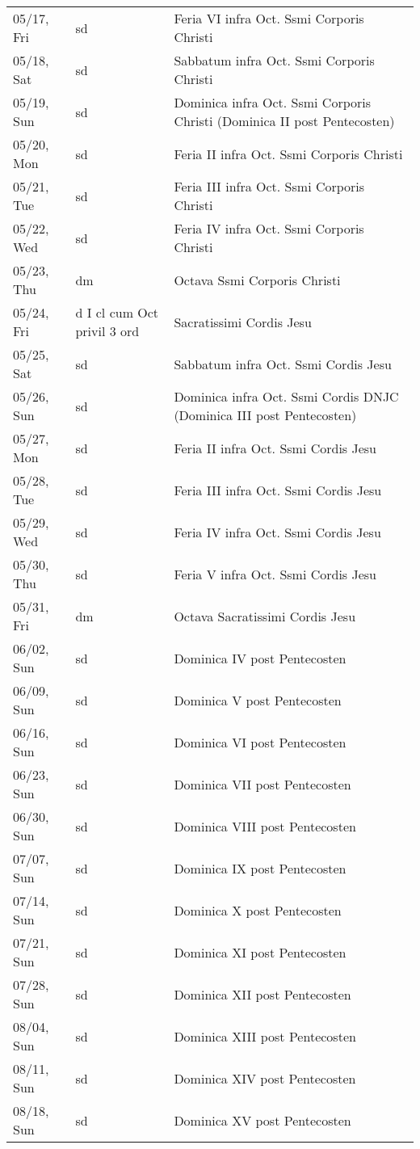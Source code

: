 \documentclass{article}
\begin{document}
\begin{longtable}{ l l l }
05/17, Fri & sd & Feria VI infra Oct. Ssmi Corporis Christi\\
05/18, Sat & sd & Sabbatum infra Oct. Ssmi Corporis Christi\\
05/19, Sun & sd & Dominica infra Oct. Ssmi Corporis Christi (Dominica II post Pentecosten)\\
05/20, Mon & sd & Feria II infra Oct. Ssmi Corporis Christi\\
05/21, Tue & sd & Feria III infra Oct. Ssmi Corporis Christi\\
05/22, Wed & sd & Feria IV infra Oct. Ssmi Corporis Christi\\
05/23, Thu & dm & Octava Ssmi Corporis Christi\\
05/24, Fri & d I cl cum Oct privil 3 ord & Sacratissimi Cordis Jesu\\
05/25, Sat & sd & Sabbatum infra Oct. Ssmi Cordis Jesu\\
05/26, Sun & sd & Dominica infra Oct. Ssmi Cordis DNJC (Dominica III post Pentecosten)\\
05/27, Mon & sd & Feria II infra Oct. Ssmi Cordis Jesu\\
05/28, Tue & sd & Feria III infra Oct. Ssmi Cordis Jesu\\
05/29, Wed & sd & Feria IV infra Oct. Ssmi Cordis Jesu\\
05/30, Thu & sd & Feria V infra Oct. Ssmi Cordis Jesu\\
05/31, Fri & dm & Octava Sacratissimi Cordis Jesu\\
06/02, Sun & sd & Dominica IV post Pentecosten\\
06/09, Sun & sd & Dominica V post Pentecosten\\
06/16, Sun & sd & Dominica VI post Pentecosten\\
06/23, Sun & sd & Dominica VII post Pentecosten\\
06/30, Sun & sd & Dominica VIII post Pentecosten\\
07/07, Sun & sd & Dominica IX post Pentecosten\\
07/14, Sun & sd & Dominica X post Pentecosten\\
07/21, Sun & sd & Dominica XI post Pentecosten\\
07/28, Sun & sd & Dominica XII post Pentecosten\\
08/04, Sun & sd & Dominica XIII post Pentecosten\\
08/11, Sun & sd & Dominica XIV post Pentecosten\\
08/18, Sun & sd & Dominica XV post Pentecosten\\

\end{longtable}
\end{document}
